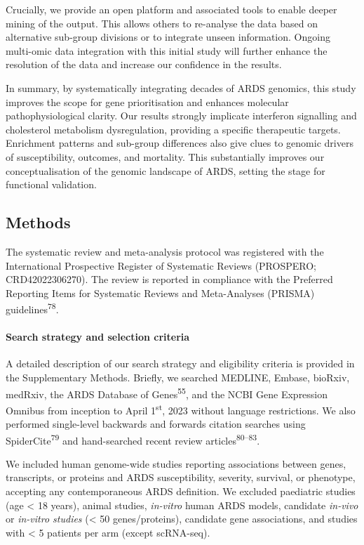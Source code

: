 \documentclass[
  11,
  a4paper,
]{article}
\let\oldparagraph\paragraph
\renewcommand{\paragraph}[1]{\oldparagraph{#1}\mbox{}}
\begin{document}
Crucially, we provide an open platform and associated tools to enable
deeper mining of the output. This allows others to re-analyse the data
based on alternative sub-group divisions or to integrate unseen
information. Ongoing multi-omic data integration with this initial study
will further enhance the resolution of the data and increase our
confidence in the results.

In summary, by systematically integrating decades of ARDS genomics, this
study improves the scope for gene prioritisation and enhances molecular
pathophysiological clarity. Our results strongly implicate interferon
signalling and cholesterol metabolism dysregulation, providing a
specific therapeutic targets. Enrichment patterns and sub-group
differences also give clues to genomic drivers of susceptibility,
outcomes, and mortality. This substantially improves our
conceptualisation of the genomic landscape of ARDS, setting the stage
for functional validation.

\newpage

\hypertarget{methods}{%
\subsection{Methods}\label{methods}}

The systematic review and meta-analysis protocol was registered with the
International Prospective Register of Systematic Reviews (PROSPERO;
CRD42022306270). The review is reported in compliance with the Preferred
Reporting Items for Systematic Reviews and Meta-Analyses (PRISMA)
guidelines\textsuperscript{78}.

\hypertarget{search-strategy-and-selection-criteria}{%
\paragraph{Search strategy and selection
criteria}\label{search-strategy-and-selection-criteria}}

A detailed description of our search strategy and eligibility criteria
is provided in the Supplementary Methods. Briefly, we searched MEDLINE,
Embase, bioRxiv, medRxiv, the ARDS Database of
Genes\textsuperscript{55}, and the NCBI Gene Expression Omnibus from
inception to April 1\textsuperscript{st}, 2023 without language
restrictions. We also performed single-level backwards and forwards
citation searches using SpiderCite\textsuperscript{79} and hand-searched
recent review articles\textsuperscript{80--83}.

We included human genome-wide studies reporting associations between
genes, transcripts, or proteins and ARDS susceptibility, severity,
survival, or phenotype, accepting any contemporaneous ARDS definition.
We excluded paediatric studies (age \textless{} 18 years), animal
studies, \emph{in-vitro} human ARDS models, candidate \emph{in-vivo} or
\emph{in-vitro studies} (\textless{} 50 genes/proteins), candidate gene
associations, and studies with \textless{} 5 patients per arm (except
scRNA-seq).
\end{document}
